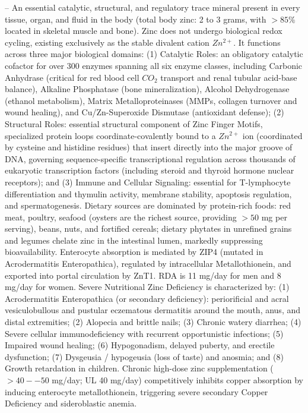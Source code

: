 -- An essential catalytic, structural, and regulatory trace mineral present in every tissue, organ, and fluid in the body (total body zinc: 2 to 3 grams, with $>85\%$ located in skeletal muscle and bone). Zinc does not undergo biological redox cycling, existing exclusively as the stable divalent cation $Zn^{2+}$. It functions across three major biological domains: (1) Catalytic Roles: an obligatory catalytic cofactor for over 300 enzymes spanning all six enzyme classes, including Carbonic Anhydrase (critical for red blood cell $CO_2$ transport and renal tubular acid-base balance), Alkaline Phosphatase (bone mineralization), Alcohol Dehydrogenase (ethanol metabolism), Matrix Metalloproteinases (MMPs, collagen turnover and wound healing), and Cu/Zn-Superoxide Dismutase (antioxidant defense); (2) Structural Roles: essential structural component of Zinc Finger Motifs, specialized protein loops coordinate-covalently bound to a $Zn^{2+}$ ion (coordinated by cysteine and histidine residues) that insert directly into the major groove of DNA, governing sequence-specific transcriptional regulation across thousands of eukaryotic transcription factors (including steroid and thyroid hormone nuclear receptors); and (3) Immune and Cellular Signaling: essential for T-lymphocyte differentiation and thymulin activity, membrane stability, apoptosis regulation, and spermatogenesis. Dietary sources are dominated by protein-rich foods: red meat, poultry, seafood (oysters are the richest source, providing $>50$ mg per serving), beans, nuts, and fortified cereals; dietary phytates in unrefined grains and legumes chelate zinc in the intestinal lumen, markedly suppressing bioavailability. Enterocyte absorption is mediated by ZIP4 (mutated in Acrodermatitis Enteropathica), regulated by intracellular Metallothionein, and exported into portal circulation by ZnT1. RDA is 11 mg/day for men and 8 mg/day for women. Severe Nutritional Zinc Deficiency is characterized by: (1) Acrodermatitis Enteropathica (or secondary deficiency): periorificial and acral vesiculobullous and pustular eczematous dermatitis around the mouth, anus, and distal extremities; (2) Alopecia and brittle nails; (3) Chronic watery diarrhea; (4) Severe cellular immunodeficiency with recurrent opportunistic infections; (5) Impaired wound healing; (6) Hypogonadism, delayed puberty, and erectile dysfunction; (7) Dysgeusia / hypogeusia (loss of taste) and anosmia; and (8) Growth retardation in children. Chronic high-dose zinc supplementation ($>40--50$ mg/day; UL 40 mg/day) competitively inhibits copper absorption by inducing enterocyte metallothionein, triggering severe secondary Copper Deficiency and sideroblastic anemia.

